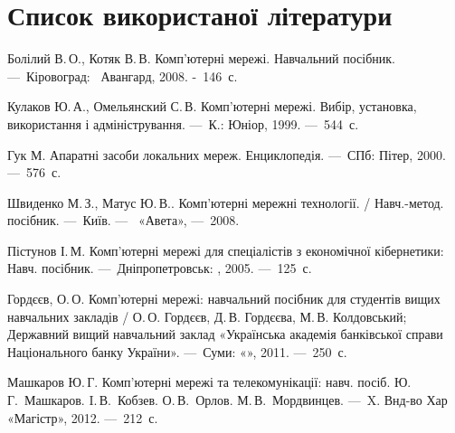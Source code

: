\documentclass[
  ukrainian,
  simple,
  floatsection,
]{eskdnaukvd}
\begin{document}
  \section*{Список використаної літератури}
  \begin{litlist}
    \item Болілий В.\,О., Котяк В.\,В. Комп'ютерні мережі. Навчальний посібник. —~Кіровоград: ~Авангард, 2008. -~146~с.
    \item Кулаков Ю.\,А., Омельянский С.\,В. Комп’ютерні мережі. Вибір, установка, використання і адміністрування. —~К.: Юніор, 1999. —~544~с.
    \item Гук М. Апаратні засоби локальних мереж. Енциклопедія. —~СПб: Пітер, 2000. —~576~с.
    \item Швиденко М.\,З., Матус Ю.\,В.. Комп’ютерні мережні технології. / Навч.-метод. посібник. —~Київ. —~ «Авета», —~2008.
    \item Пістунов І.\,М. Комп'ютерні мережі для спеціалістів з економічної кібернетики: Навч. посібник. —~Дніпропетровськ: , 2005. —~125~с.
    \item Гордєєв, О.\,О. Комп’ютерні мережі: навчальний посібник для студентів вищих навчальних закладів / О.\,О. Гордєєв, Д.\,В. Гордєєва, М.\,В. Колдовський; Державний вищий навчальний заклад «Українська академія банківської справи Національного банку України». —~Суми:  «», 2011. —~250~с.
    \item Машкаров Ю.\,Г. Комп’ютерні мережі та телекомунікації: навч. посіб. Ю.\,Г.~Машкаров. I.\,В.~Кобзев. О.\,В.~Орлов. М.\,В.~Мордвинцев. —~X. Внд-во Хар  «Магістр», 2012. —~212~с.
  \end{litlist}
\end{document}
